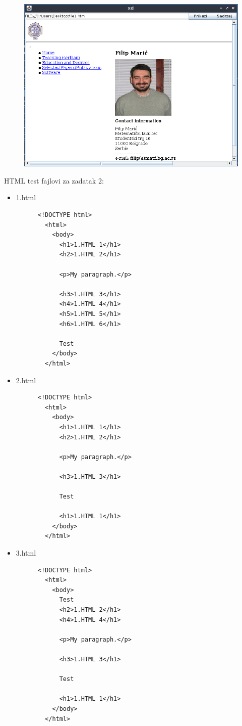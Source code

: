\documentclass[]{article}
\begin{document}
\begin{enumerate}
  \begin{figure}[H]
    \centering
    \includegraphics[scale=0.6]{fig2.PNG}
    \label{fig2}
  \end{figure}

\end{enumerate}

\newpage

HTML test fajlovi za zadatak 2:

\begin{itemize}
  \item 1.html
    \begin{lstlisting}
      <!DOCTYPE html>
        <html>
          <body>
            <h1>1.HTML 1</h1>
            <h2>1.HTML 2</h1>
            
            <p>My paragraph.</p>

            <h3>1.HTML 3</h1>
            <h4>1.HTML 4</h1>
            <h5>1.HTML 5</h1>
            <h6>1.HTML 6</h1>

            Test
          </body>
        </html>
    \end{lstlisting}
  \item 2.html
    \begin{lstlisting}
      <!DOCTYPE html>
        <html>
          <body>
            <h1>1.HTML 1</h1>
            <h2>1.HTML 2</h1>
            
            <p>My paragraph.</p>

            <h3>1.HTML 3</h1>

            Test

            <h1>1.HTML 1</h1>
          </body>
        </html>
    \end{lstlisting}
  \item 3.html
     \begin{lstlisting}
      <!DOCTYPE html>
        <html>
          <body>
            Test
            <h2>1.HTML 2</h1>
            <h4>1.HTML 4</h1>
            
            <p>My paragraph.</p>

            <h3>1.HTML 3</h1>

            Test

            <h1>1.HTML 1</h1>
          </body>
        </html>
    \end{lstlisting}
\end{itemize}
\end{document}
